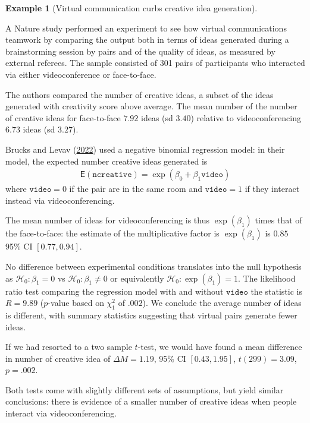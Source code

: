\documentclass[
  11pt,
  letterpaper,
]{scrbook}
\theoremstyle{definition}
\newtheorem{example}{Example}[chapter]
\theoremstyle{remark}
\begin{document}
\begin{example}[Virtual communication curbs creative idea
generation]\protect\hypertarget{exm-BrucksLevav22}{}\label{exm-BrucksLevav22}

A Nature study performed an experiment to see how virtual communications
teamwork by comparing the output both in terms of ideas generated during
a brainstorming session by pairs and of the quality of ideas, as
measured by external referees. The sample consisted of 301 pairs of
participants who interacted via either videoconference or face-to-face.

The authors compared the number of creative ideas, a subset of the ideas
generated with creativity score above average. The mean number of the
number of creative ideas for face-to-face \(7.92\) ideas (sd \(3.40\))
relative to videoconferencing \(6.73\) ideas (sd \(3.27\)).

Brucks and Levav (\protect\hyperlink{ref-Brucks.Levav:2022}{2022}) used
a negative binomial regression model: in their model, the expected
number creative ideas generated is \begin{align*}
\mathsf{E}(\texttt{ncreative}) = \exp(\beta_0 + \beta_1 \texttt{video})
\end{align*} where \(\texttt{video}=0\) if the pair are in the same room
and \(\texttt{video}=1\) if they interact instead via videoconferencing.

The mean number of ideas for videoconferencing is thus \(\exp(\beta_1)\)
times that of the face-to-face: the estimate of the multiplicative
factor is \(\exp(\beta_1)\) is \(0.85\) 95\% CI \([0.77, 0.94]\).

No difference between experimental conditions translates into the null
hypothesis as \(\mathscr{H}_0: \beta_1=0\) vs
\(\mathscr{H}_0: \beta_1 \neq 0\) or equivalently
\(\mathscr{H}_0: \exp(\beta_1)=1\). The likelihood ratio test comparing
the regression model with and without \(\texttt{video}\) the statistic
is \(R=9.89\) (\(p\)-value based on \(\chi^2_1\) of \(.002\)). We
conclude the average number of ideas is different, with summary
statistics suggesting that virtual pairs generate fewer ideas.

If we had resorted to a two sample \(t\)-test, we would have found a
mean difference in number of creative idea of \(\Delta M = 1.19\), 95\%
CI \([0.43, 1.95]\), \(t(299) = 3.09\), \(p = .002\).

Both tests come with slightly different sets of assumptions, but yield
similar conclusions: there is evidence of a smaller number of creative
ideas when people interact via videoconferencing.

\end{example}
\end{document}
